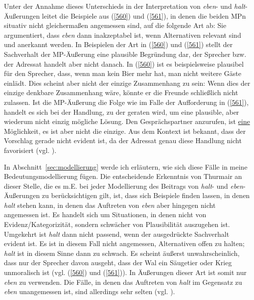 Unter der Annahme dieses Unterschieds in der Interpretation von \textit{eben}- und \textit{halt}-Äußerungen leitet \citet{Thurmair1989} die Beispiele aus (\ref{560}) und (\ref{561}), in denen die beiden MPn situativ nicht gleichermaßen angemessen sind, auf die folgende Art ab: Sie argumentiert, dass \textit{eben} dann inakzeptabel ist, wenn Alternativen relevant sind und anerkannt werden. In Beispielen der Art in (\ref{560}) und (\ref{561}) stellt der Sachverhalt der MP-Äußerung eine plausible Begründung dar, der Sprecher bzw. der Adressat handelt aber nicht danach. In (\ref{560}) ist es beispielsweise plausibel für den Sprecher, dass, wenn man kein Bier mehr hat, man nicht weitere Gäste einlädt. Dies scheint aber nicht der einzige Zusammenhang zu sein: Wenn dies der einzige denkbare Zusammenhang wäre, könnte er die Freunde schließlich nicht zulassen. Ist die MP-Äußerung die Folge wie im Falle der Aufforderung in (\ref{561}), handelt es sich bei der Handlung, zu der geraten wird, um eine plausible, aber wiederum nicht einzig mögliche Lösung. Den Gesprächspartner anzurufen, ist \underline{eine} Möglichkeit, es ist aber nicht die einzige. Aus dem Kontext ist bekannt, dass der Vorschlag gerade nicht evident ist, da der Adressat genau diese Handlung nicht favorisiert (vgl. \citealt[127]{Thurmair1989}).

In Abschnitt~\ref{sec:modellierung} werde ich erläutern, wie sich diese Fälle in meine Bedeutung\-smodellierung fügen. Die entscheidende Erkenntnis von Thurmair an dieser Stelle, die es m.E. bei jeder Modellierung des Beitrags von \textit{halt}- und \textit{eben}-Äußerungen zu berücksichtigen gilt, ist, dass sich Beispiele finden lassen, in denen \textit{halt} stehen kann, in denen das Auftreten von \textit{eben} aber hingegen nicht angemessen ist. Es handelt sich um Situationen, in denen nicht von Evidenz/Kategorizität, sondern schwächer von Plausibilität auszugehen ist. Umgekehrt ist \textit{halt} dann nicht passend, wenn der ausgedrückte Sachverhalt evident ist. Es ist in diesem Fall nicht angemessen, Alternativen offen zu halten; \textit{halt} ist in diesem Sinne dann zu schwach. Es scheint äußerst unwahrscheinlich, dass nur der Sprecher davon ausgeht, dass der Wal ein Säugetier oder Krieg unmoralisch ist (vgl. (\ref{560}) und (\ref{561})). In Äußerungen dieser Art ist somit nur \textit{eben} zu verwenden. Die Fälle, in denen das Auftreten von \textit{halt} im Gegensatz zu \textit{eben} unangemessen ist, sind allerdings sehr selten (vgl. \citealt[128]{Thurmair1989}).

